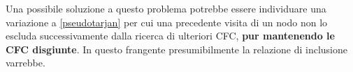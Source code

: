 \documentclass[10pt,a4paper]{article}
\begin{document}
Una possibile soluzione a questo problema potrebbe essere individuare una variazione a \ref{pseudotarjan} per cui una precedente visita di un nodo non lo  escluda successivamente dalla ricerca di ulteriori CFC, \textbf{pur mantenendo le CFC disgiunte}. In questo frangente presumibilmente la relazione di inclusione varrebbe.

\end{document}
